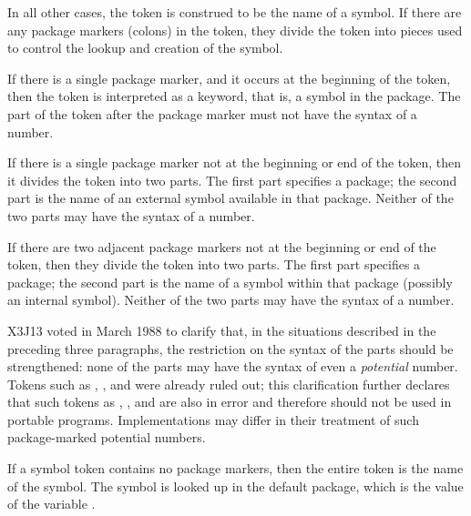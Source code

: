 In all other cases, the token is construed to be the name of a symbol.
If there are any package markers
(colons) in the token, they divide the token into pieces used to
control the lookup and creation of the symbol.

\begin{obsolete}
If there is a single package marker, and it occurs at the beginning of the
token, then the token is interpreted as a keyword, that is, a symbol in the
 package.  The part of the token after the package marker must
not have the syntax of a number.

If there is a single package marker not at the beginning or end of the
token, then it divides the token into two parts.  The first part
specifies a package; the second part is the name of an external symbol
available in that package.  Neither of the two parts may have the syntax
of a number.

If there are two adjacent package markers not at the beginning or end of the
token, then they divide the token into two parts.  The first part
specifies a package; the second part is the name of a symbol within
that package (possibly an internal symbol).
Neither of the two parts may have the syntax of a number.
\end{obsolete}

\begin{new}
X3J13 voted in March 1988
to clarify that, in the situations described in the
preceding three paragraphs, the restriction on the syntax of the parts should
be strengthened:  none of the parts may have the syntax of even
a \emph{potential} number.  Tokens such as , ,
and  were already ruled out; this clarification further
declares that such tokens as , ,
and  are also in error and therefore should not be used
in portable programs.  Implementations may differ in their treatment of
such package-marked potential numbers.
\end{new}

If a symbol token contains no package markers, then the entire token
is the name of the symbol.  The symbol is looked up in
the default package, which is the value
of the variable .


